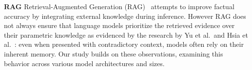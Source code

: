 \textbf{RAG}
Retrieval-Augmented Generation (RAG)~\cite{rag} attempts to improve factual accuracy by integrating external knowledge during inference.
However RAG does not always ensure that language models prioritize the retrieved evidence over their parametric knowledge as evidenced by the research by Yu et al.\ and Hsia et al.~\cite{ragged,factual_recall}: even when presented with contradictory context, models often rely on their inherent memory.
Our study builds on these observations, examining this behavior across various model architectures and sizes.
